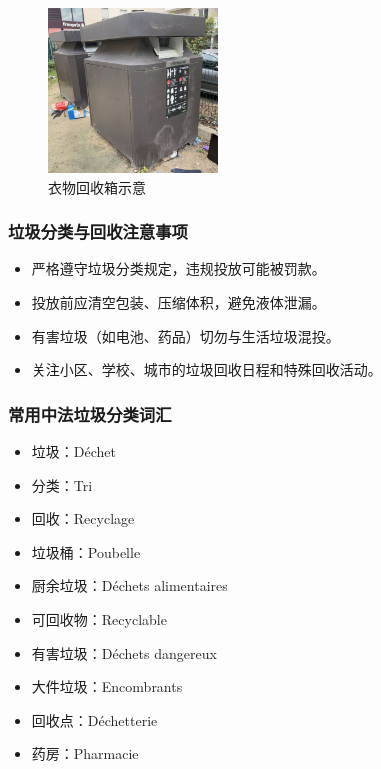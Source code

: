 \begin{figure}[h]
    \centering
    \includegraphics[width=0.4\textwidth]{chapters/06_life/images/garbage_bin_clothes.jpg}
    \caption{衣物回收箱示意}
\end{figure}

\subsubsection{垃圾分类与回收注意事项}
\begin{itemize}
    \item 严格遵守垃圾分类规定，违规投放可能被罚款。
    \item 投放前应清空包装、压缩体积，避免液体泄漏。
    \item 有害垃圾（如电池、药品）切勿与生活垃圾混投。
    \item 关注小区、学校、城市的垃圾回收日程和特殊回收活动。
\end{itemize}

\subsubsection{常用中法垃圾分类词汇}
\begin{itemize}
    \item 垃圾：Déchet
    \item 分类：Tri
    \item 回收：Recyclage
    \item 垃圾桶：Poubelle
    \item 厨余垃圾：Déchets alimentaires
    \item 可回收物：Recyclable
    \item 有害垃圾：Déchets dangereux
    \item 大件垃圾：Encombrants
    \item 回收点：Déchetterie
    \item 药房：Pharmacie
\end{itemize}

